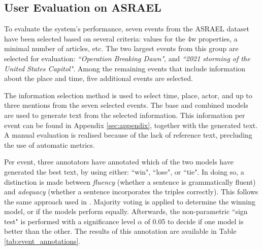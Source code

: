 \documentclass[
hf, %
]{ceurart}
\begin{document}
\subsection{User Evaluation on ASRAEL}
\label{sec:result_gen_text_nodes}
To evaluate the system's performance, seven events from the ASRAEL dataset have been selected based on several criteria: values for the 4w properties, a minimal number of articles, etc. The two largest events from this group are selected for evaluation: \textit{``Operation Breaking Dawn"}, and \textit{``2021 storming of the United States Capitol"}. Among the remaining events that include information about the place and time, five additional events are selected.

The information selection method is used to select time, place, actor, and up to three mentions from the seven selected events. The base and combined models are used to generate text from the selected information. This information per event can be found in Appendix \ref{sec:appendix}, together with the generated text. A manual evaluation is realised because of the lack of reference text, precluding the use of automatic metrics. 

Per event, three annotators have annotated which of the two models have generated the best text, by using either: ``win", ``lose", or ``tie". In doing so, a distinction is made between \textit{fluency} (whether a sentence is grammatically fluent) and \textit{adequacy} (whether a sentence incorporates the triples correctly). This follows the same approach used in \cite{JointGT}. Majority voting is applied to determine the winning model, or if the models perform equally. Afterwards, the non-parametric ``sign test" is performed with a significance level $\alpha$ of 0.05 to decide if one model is better than the other. The results of this annotation are available in Table \ref{tab:event_annotations}.
\end{document}
